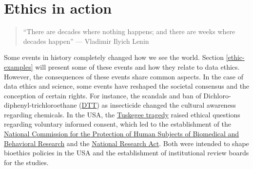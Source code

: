 \documentclass[
]{book}
\begin{document}
\hypertarget{ethics-in-action}{%
\section{Ethics in action}\label{ethics-in-action}}

\begin{quote}
``There are decades where nothing happens; and there are weeks where decades happen'' --- Vladimir Ilyich Lenin \citep{friedman2014there}
\end{quote}

Some events in history completely changed how we see the world. Section \ref{ethic-examples} will present some of these events and how they relate to data ethics. However, the consequences of these events share common aspects. In the case of data ethics and science, some events have reshaped the societal consensus and the conception of certain rights. For instance, the scandals and ban of Dichloro-diphenyl-trichloroethane (\href{https://www.nytimes.com/2004/04/11/magazine/what-the-world-needs-now-is-ddt.html}{DTT}) as insecticide changed the cultural awareness regarding chemicals. In the USA, the \href{https://en.wikipedia.org/wiki/Tuskegee_Syphilis_Study}{Tuskegee tragedy} raised ethical questions regarding voluntary informed consent, which led to the establishment of the \href{https://en.wikipedia.org/wiki/National_Commission_for_the_Protection_of_Human_Subjects_of_Biomedical_and_Behavioral_Research}{National Commission for the Protection of Human Subjects of Biomedical and Behavioral Research} and the \href{https://en.wikipedia.org/wiki/National_Research_Act}{National Research Act}. Both were intended to shape bioethics policies in the USA and the establishment of institutional review boards for the studies.
\end{document}
